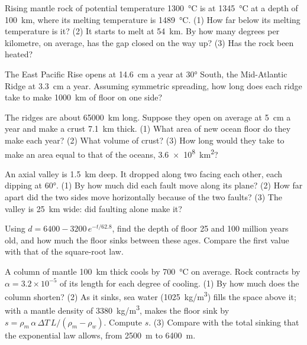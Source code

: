 \begin{exercise}[$\star\star$]\label{exo:g11:ocean-ridges:7}
Rising mantle rock of potential temperature \qty{1300}{\celsius} is at
\qty{1345}{\celsius} at a depth of \qty{100}{km}, where its melting
temperature is \qty{1489}{\celsius}. (1) How far below its melting
temperature is it? (2) It starts to melt at \qty{54}{km}. By how many degrees
per kilometre, on average, has the gap closed on the way up? (3) Has the rock
been heated?
\end{exercise}

\begin{exercise}[$\star\star$]\label{exo:g11:ocean-ridges:8}
The East Pacific Rise opens at \qty{14.6}{cm} a year at \ang{30} South, the
Mid-Atlantic Ridge at \qty{3.3}{cm} a year. Assuming symmetric spreading, how
long does each ridge take to make \qty{1000}{km} of floor on one side?
\end{exercise}

\begin{exercise}[$\star\star$]\label{exo:g11:ocean-ridges:9}
The ridges are about \qty{65000}{km} long. Suppose they open on average at
\qty{5}{cm} a year and make a crust \qty{7.1}{km} thick. (1) What area of new
ocean floor do they make each year? (2) What volume of crust? (3) How long
would they take to make an area equal to that of the oceans,
\qty{3.6e8}{km^2}?
\end{exercise}

\begin{exercise}[$\star\star$]\label{exo:g11:ocean-ridges:10}
An axial valley is \qty{1.5}{km} deep. It dropped along two 
facing each other, each dipping at \ang{60}. (1) By how much did each fault
move along its plane? (2) How far apart did the two sides move horizontally
because of the two faults? (3) The valley is \qty{25}{km} wide: did faulting
alone make it?
\end{exercise}

\begin{exercise}[$\star\star$]\label{exo:g11:ocean-ridges:11}
Using $d = 6400 - 3200\,e^{-t/62.8}$, find the depth of floor 25 and 100
million years old, and how much the floor sinks between these ages. Compare
the first value with that of the square-root law.
\end{exercise}

\begin{exercise}[$\star\star\star$]\label{exo:g11:ocean-ridges:12}
A column of mantle \qty{100}{km} thick cools by \qty{700}{\celsius} on
average. Rock contracts by $\alpha = 3.2 \times 10^{-5}$ of its length for
each degree of cooling. (1) By how much does the column shorten? (2) As it
sinks, sea water (\qty{1025}{kg/m^3}) fills the space above it; with a mantle
density of \qty{3380}{kg/m^3},  makes the floor sink by
$s = \rho_m\,\alpha\,\Delta T\,L/(\rho_m - \rho_w)$. Compute $s$. (3) Compare
with the total sinking that the exponential law allows, from \qty{2500}{m} to
\qty{6400}{m}.
\end{exercise}


